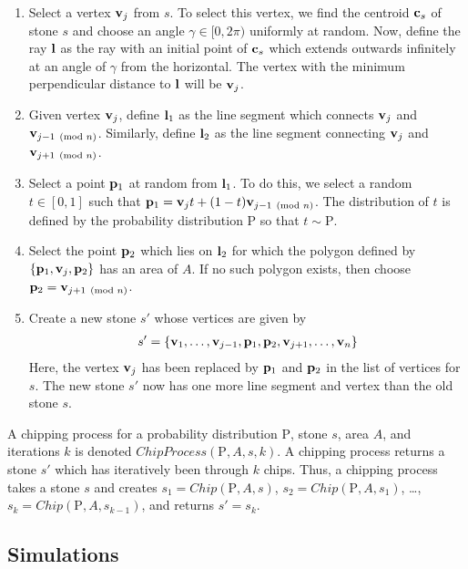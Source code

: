 \begin{enumerate}
  \item Select a vertex $\mathbf{v}_j$ from $s$. To select this vertex, we find the centroid $\mathbf{c}_s$ of stone $s$ and choose an angle $\gamma \in [0, 2\pi)$ uniformly at random. Now, define the ray $\mathbf{l}$ as the ray with an initial point of $\mathbf{c}_s$ which extends outwards infinitely at an angle of $\gamma$ from the horizontal. The vertex with the minimum perpendicular distance to $\mathbf{l}$ will be $\mathbf{v}_j$.
  \item Given vertex $\mathbf{v}_j$, define $\mathbf{l}_1$ as the line segment which connects $\mathbf{v}_j$ and $\mathbf{v}_{{j-1} \pmod{n}}$. Similarly, define $\mathbf{l}_2$ as the line segment connecting $\mathbf{v}_j$ and $\mathbf{v}_{{j+1} \pmod{n}}$.
  \item Select a point $\mathbf{p}_1$ at random from $\mathbf{l}_1$. To do this, we select a random $t \in [0,1]$ such that $\mathbf{p}_1 = \mathbf{v}_j t + (1-t) \mathbf{v}_{{j-1} \pmod{n}}$. The distribution of $t$ is defined by the probability distribution $\mathrm{P}$ so that $t \sim \mathrm{P}$.
  \item Select the point $\mathbf{p}_2$ which lies on $\mathbf{l}_2$ for which the polygon defined by $\{\mathbf{p}_1, \mathbf{v}_j, \mathbf{p}_2\}$ has an area of $A$. If no such polygon exists, then choose $\mathbf{p}_2 = \mathbf{v}_{{j+1} \pmod{n}}$.
  \item Create a new stone $s'$ whose vertices are given by
    \begin{eqnarray*}
      s' = \{ \mathbf{v}_1, \ldots, \mathbf{v}_{j-1}, \mathbf{p}_1, \mathbf{p}_2, \mathbf{v}_{j+1}, \ldots, \mathbf{v}_n \}
    \end{eqnarray*}
    Here, the vertex $\mathbf{v}_j$ has been replaced by $\mathbf{p}_1$ and $\mathbf{p}_2$ in the list of vertices for $s$. The new stone $s'$ now has one more line segment and vertex than the old stone $s$.
\end{enumerate}

A chipping process for a probability distribution $\mathrm{P}$, stone $s$, area $A$, and iterations $k$ is denoted $ChipProcess(\mathrm{P}, A, s, k)$. A chipping process returns a stone $s'$ which has iteratively been through $k$ chips. Thus, a chipping process takes a stone $s$ and creates $s_1 = Chip(\mathrm{P}, A, s)$, $s_2 = Chip(\mathrm{P}, A, s_1)$, \ldots, $s_k = Chip(\mathrm{P}, A, s_{k-1})$, and returns $s' = s_k$.

\subsection{Simulations}

